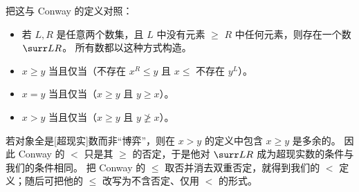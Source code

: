 \noindent
把这与 Conway 的定义对照：
\begin{itemize}\footnotesize
\item[-] 若 $L,R$ 是任意两个数集，且 $L$ 中没有元素 $\ge$ $R$ 中任何元素，则存在一个数 $\surr L R$。
  所有数都以这种方式构造。
\item[-] $x\ge y$ 当且仅当（不存在 $x^R\le y$ 且 $x\le$ 不存在 $y^L$）。
\item[-] $x=y$ 当且仅当（$x \ge y$ 且 $y\ge x$）。
\item[-] $x>y$ 当且仅当（$x\ge y$ 且 $y\not\ge x$）。
\end{itemize}
若对象全是[超现实]数而非“博弈”，则在 $x>y$ 的定义中包含 $x\ge y$ 是多余的。
因此 Conway 的 $<$ 只是其 $\ge$ 的否定，于是他对 $\surr L R$ 成为超现实数的条件与我们的条件相同。
把 Conway 的 $\le$ 取否并消去双重否定，就得到我们的 $<$ 定义；随后可把他的 $\le$ 改写为不含否定、仅用 $<$ 的形式。

